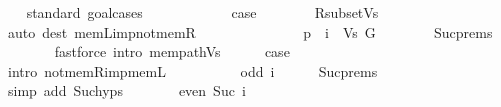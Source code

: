 \begin{isabellebody}
\ \ \isamarkupfalse%
\ {\isacharparenleft}{\kern0pt}standard{\isacharcomma}{\kern0pt}\ goal{\isacharunderscore}{\kern0pt}cases{\isacharparenright}{\kern0pt}\isanewline
\ \ \ \ \isamarkupfalse%
\ {}\isanewline
\ \ \ \ \isamarkupfalse%
\ {\isacharquery}{\kern0pt}case\isanewline
\ \ \ \ \ \ \isamarkupfalse%
\ R{\isacharunderscore}{\kern0pt}subset{\isacharunderscore}{\kern0pt}Vs\isanewline
\ \ \ \ \ \ \isamarkupfalse%
\ {\isacharparenleft}{\kern0pt}auto\ dest{\isacharcolon}{\kern0pt}\ mem{\isacharunderscore}{\kern0pt}L{\isacharunderscore}{\kern0pt}imp{\isacharunderscore}{\kern0pt}not{\isacharunderscore}{\kern0pt}mem{\isacharunderscore}{\kern0pt}R{\isacharparenright}{\kern0pt}\isanewline
\ \ \isamarkupfalse%
\isanewline
\ \ \ \ \isamarkupfalse%
\ {}\isanewline
\ \ \ \ \isamarkupfalse%
\ {\isachardoublequoteopen}p\ {\isacharbang}{\kern0pt}\ i\ {\isasymin}\ Vs\ G{\isachardoublequoteclose}\isanewline
\ \ \ \ \ \ \isamarkupfalse%
\ Suc{\isachardot}{\kern0pt}prems{\isacharparenleft}{\kern0pt}{}{\isacharcomma}{\kern0pt}\ {}{\isacharparenright}{\kern0pt}\isanewline
\ \ \ \ \ \ \isamarkupfalse%
\ {\isacharparenleft}{\kern0pt}fastforce\ intro{\isacharcolon}{\kern0pt}\ mem{\isacharunderscore}{\kern0pt}path{\isacharunderscore}{\kern0pt}Vs{\isacharparenright}{\kern0pt}\isanewline
\ \ \ \ \isamarkupfalse%
\ {\isacharquery}{\kern0pt}case\isanewline
\ \ \ \ \ \ \isamarkupfalse%
\ {}\isanewline
\ \ \ \ \ \ \isamarkupfalse%
\ {\isacharparenleft}{\kern0pt}intro\ not{\isacharunderscore}{\kern0pt}mem{\isacharunderscore}{\kern0pt}R{\isacharunderscore}{\kern0pt}imp{\isacharunderscore}{\kern0pt}mem{\isacharunderscore}{\kern0pt}L{\isacharparenright}{\kern0pt}\isanewline
\ \ \isamarkupfalse%
\isanewline
\ \ \isamarkupfalse%
\ \isamarkupfalse%
\ {\isachardoublequoteopen}{\isachardot}{\kern0pt}{\isachardot}{\kern0pt}{\isachardot}{\kern0pt}\ {\isasymlongleftrightarrow}\ odd\ i{\isachardoublequoteclose}\isanewline
\ \ \ \ \isamarkupfalse%
\ Suc{\isachardot}{\kern0pt}prems\isanewline
\ \ \ \ \isamarkupfalse%
\ {\isacharparenleft}{\kern0pt}simp\ add{\isacharcolon}{\kern0pt}\ Suc{\isachardot}{\kern0pt}hyps{\isacharparenright}{\kern0pt}\isanewline
\ \ \isamarkupfalse%
\ \isamarkupfalse%
\ {\isachardoublequoteopen}{\isachardot}{\kern0pt}{\isachardot}{\kern0pt}{\isachardot}{\kern0pt}\ {\isasymlongleftrightarrow}\ even\ {\isacharparenleft}{\kern0pt}Suc\ i{\isacharparenright}{\kern0pt}{\isachardoublequoteclose}\isanewline

\end{isabellebody}
